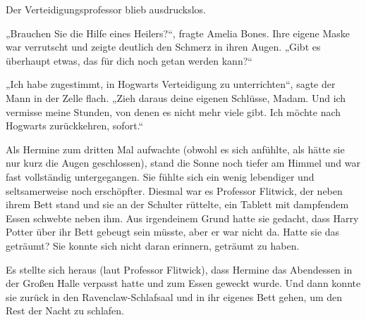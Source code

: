 Der Verteidigungsprofessor blieb ausdruckslos.

„Brauchen Sie die Hilfe eines Heilers?“, fragte Amelia Bones.
Ihre eigene Maske war verrutscht und zeigte deutlich den Schmerz in ihren Augen. „Gibt es überhaupt etwas, das für dich noch getan werden kann?“

„Ich habe zugestimmt, in Hogwarts Verteidigung zu unterrichten“, sagte der Mann in der Zelle flach. „Zieh daraus deine eigenen Schlüsse, Madam. Und ich vermisse meine Stunden, von denen es nicht mehr viele gibt. Ich möchte nach Hogwarts zurückkehren, sofort.“

\later

Als Hermine zum dritten Mal aufwachte (obwohl es sich anfühlte, als hätte sie nur kurz die Augen geschlossen), stand die Sonne noch tiefer am Himmel und war fast vollständig untergegangen. Sie fühlte sich ein wenig lebendiger und seltsamerweise noch erschöpfter. Diesmal war es Professor Flitwick, der neben ihrem Bett stand und sie an der Schulter rüttelte, ein Tablett mit dampfendem Essen schwebte neben ihm. Aus irgendeinem Grund hatte sie gedacht, dass Harry Potter über ihr Bett gebeugt sein müsste, aber er war nicht da.
Hatte sie das geträumt? Sie konnte sich nicht daran erinnern, geträumt zu haben.

Es stellte sich heraus (laut Professor Flitwick), dass Hermine das Abendessen in der Großen Halle verpasst hatte und zum Essen geweckt wurde. Und dann konnte sie zurück in den Ravenclaw-Schlafsaal und in ihr eigenes Bett gehen, um den Rest der Nacht zu schlafen.

